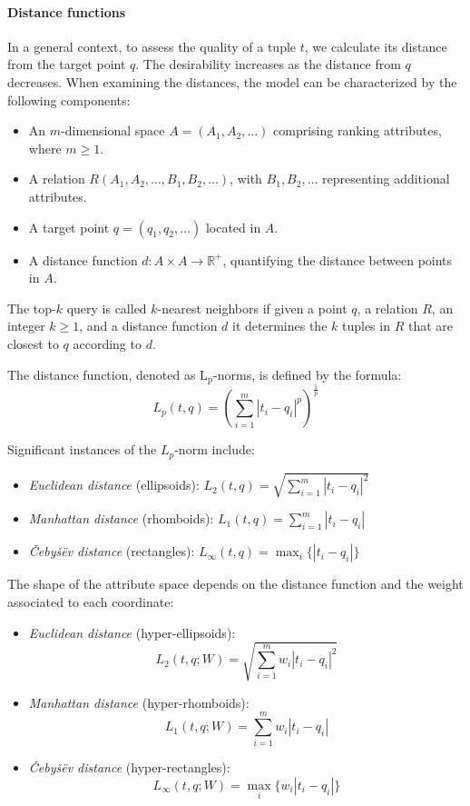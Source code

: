 \paragraph*{Distance functions}
In a general context, to assess the quality of a tuple $t$, we calculate its distance from the target point $q$. 
The desirability increases as the distance from $q$ decreases. 
When examining the distances, the model can be characterized by the following components:
\begin{itemize}
    \item An $m$-dimensional space $A = (A_1, A_2, \dots)$ comprising ranking attributes, where $m \geq 1$.
    \item A relation $R(A_1, A_2, \dots, B_1, B_2, \dots)$, with $B_1, B_2, \dots$ representing additional attributes.
    \item A target point $q = (q_1, q_2, \dots)$ located in $A$.
    \item A distance function $d: A \times A \rightarrow \mathbb{R}^{+}$, quantifying the distance between points in $A$.
\end{itemize}
\begin{definition}
    The top-$k$ query is called $k$-nearest neighbors if given a point $q$, a relation $R$, an integer $k \geq 1$, and a distance function $d$ it determines the $k$ tuples in $R$ that are closest to $q$ according to $d$. 
\end{definition}
\begin{definition}
    The distance function, denoted as $\text{L}_{\text{p}}$-norms, is defined by the formula:
    \[L_p(t,q)=\left(\sum_{i=1}^{m}{\left\lvert t_i-q_i \right\rvert^{p}}\right)^{\frac{1}{p}}\]
\end{definition}
Significant instances of the $L_p$-norm include:
\begin{itemize}
    \item \textit{Euclidean distance} (ellipsoids): $L_2(t,q)=\sqrt{\sum_{i=1}^{m}{\left\lvert t_i-q_i \right\rvert^{2}}}$
    \item \textit{Manhattan distance} (rhomboids): $L_1(t,q)=\sum_{i=1}^{m}{\left\lvert t_i-q_i \right\rvert}$
    \item \textit{Čebyšëv distance} (rectangles): $L_{\infty}(t,q)=\max_{i}\{\left\lvert t_i-q_i\right\rvert\}$
\end{itemize}
The shape of the attribute space depends on the distance function and the weight associated to each coordinate: 
\begin{itemize}
    \item \textit{Euclidean distance} (hyper-ellipsoids):
        \[L_2(t,q;W)=\sqrt{\sum_{i=1}^{m}{w_i\left\lvert t_i-q_i \right\rvert^{2}}}\]
    \item \textit{Manhattan distance} (hyper-rhomboids): 
        \[L_1(t,q;W)=\sum_{i=1}^{m}{w_i\left\lvert t_i-q_i \right\rvert}\]
    \item \textit{Čebyšëv distance} (hyper-rectangles): 
        \[L_{\infty}(t,q;W)=\max_{i}\{w_i \left\lvert t_i-q_i\right\rvert\}\]
\end{itemize}

